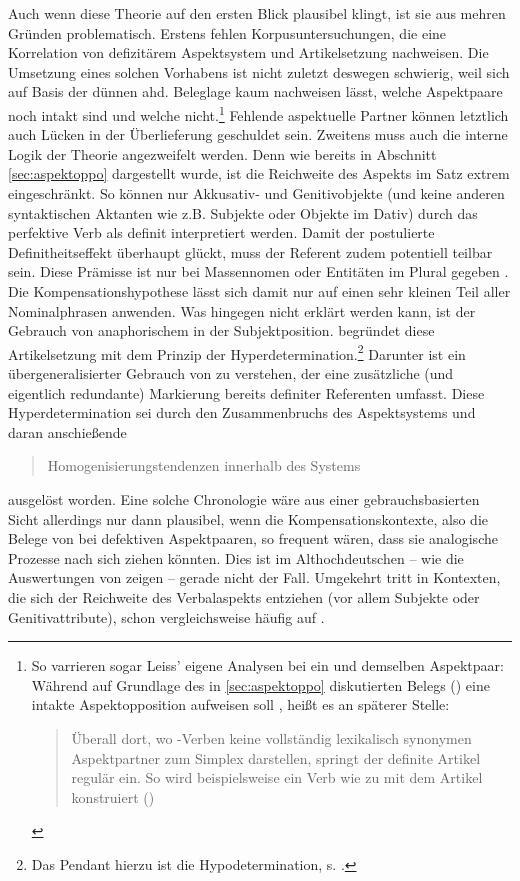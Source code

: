 Auch wenn diese Theorie auf den ersten Blick plausibel klingt, ist sie aus mehren Gründen problematisch. Erstens fehlen Korpusuntersuchungen, die eine Korrelation von defizitärem Aspektsystem und Artikelsetzung nachweisen. Die Umsetzung eines solchen Vorhabens ist nicht zuletzt deswegen schwierig, weil sich auf Basis der dünnen ahd. Beleglage kaum nachweisen lässt, welche Aspektpaare noch intakt sind und welche nicht.\footnote{So varrieren sogar Leiss' eigene Analysen bei ein und demselben Aspektpaar: Während  auf Grundlage des in \ref{sec:aspektoppo} diskutierten Belegs () eine intakte Aspektopposition aufweisen soll \parencite[171]{Leiss2000}, heißt es an späterer Stelle: \blockcquote[182]{Leiss2000}{Überall dort, wo -Verben keine vollständig lexikalisch synonymen Aspektpartner zum Simplex darstellen, springt der definite Artikel regulär ein. So wird beispielsweise ein Verb wie   zu   mit dem Artikel konstruiert ()}.} Fehlende aspektuelle Partner können letztlich auch Lücken in der Überlieferung geschuldet sein. Zweitens muss auch die interne Logik der Theorie angezweifelt werden. Denn wie bereits in Abschnitt \ref{sec:aspektoppo} dargestellt wurde, ist die Reichweite des Aspekts im Satz extrem eingeschränkt. So können nur Akkusativ- und Genitivobjekte (und keine anderen syntaktischen Aktanten wie z.B. Subjekte oder Objekte im Dativ) durch das perfektive Verb als definit interpretiert werden. Damit der postulierte Definitheitseffekt überhaupt glückt, muss der Referent zudem potentiell teilbar sein. Diese Prämisse ist nur bei Massennomen oder Entitäten im Plural gegeben \parencite{Heindl2016}. Die Kompensationshypothese lässt sich damit nur auf einen sehr kleinen Teil aller Nominalphrasen anwenden. Was hingegen nicht erklärt werden kann, ist der Gebrauch von anaphorischem  in der Subjektposition. \textcite{Leiss2000,Leiss2010} begründet diese Artikelsetzung mit dem Prinzip der Hyperdetermination.\footnote{Das Pendant hierzu ist die Hypodetermination, s. \textcite{Leiss2000}.} Darunter ist ein übergeneralisierter Gebrauch von  zu verstehen, der eine zusätzliche (und eigentlich redundante) Markierung bereits definiter Referenten umfasst. Diese Hyperdetermination sei durch den Zusammenbruchs des Aspektsystems und daran anschießende \blockcquote[196]{Leiss2000}{Homogenisierungstendenzen innerhalb des Systems} ausgelöst worden. Eine solche Chronologie wäre aus einer gebrauchsbasierten Sicht allerdings nur dann plausibel, wenn die Kompensationskontexte, also die Belege von  bei defektiven Aspektpaaren, so frequent wären, dass sie analogische Prozesse nach sich ziehen könnten. Dies ist im Althochdeutschen -- wie die Auswertungen von \textcite[170--181]{Leiss2000} zeigen -- gerade nicht der Fall. 
Umgekehrt tritt  in Kontexten, die sich der Reichweite des Verbalaspekts entziehen (vor allem Subjekte oder Genitivattribute), schon vergleichsweise häufig auf \parencite[s. z.B.][]{Oubouzar1992}.  

